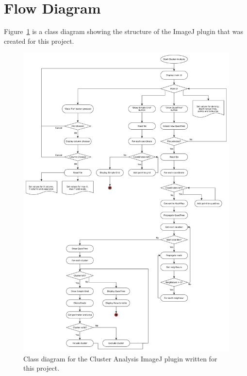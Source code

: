 
\section{Flow Diagram}
\label{sec:flow_diagram}

Figure~\ref{fig:class-diagram} is a class diagram showing the structure of the
ImageJ plugin that was created for this project.


\begin{figure}[tbhp]
	\centering
	\includegraphics[height=\textheight]{flow-chart.pdf}
	\caption{Class diagram for the Cluster Analysis ImageJ plugin written for
	this project.} \label{fig:class-diagram}
\end{figure}
